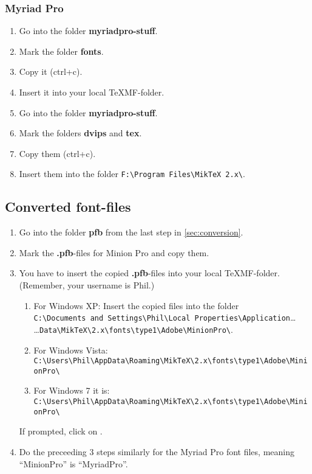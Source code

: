 \subsubsection{Myriad Pro}

\begin{enumerate}\setlength{\itemsep}{-2pt}
	\item Go into the folder \textbf{myriadpro-stuff}.
	\item Mark the folder \textbf{fonts}.
	\item Copy it (ctrl+c).
	\item Insert it into your local {\TeX}MF-folder.
	\item Go into the folder \textbf{myriadpro-stuff}.
	\item Mark the folders \textbf{dvips} and \textbf{tex}.
	\item Copy them (ctrl+c).
	\item Insert them into the folder \verb+F:\Program Files\MikTeX 2.x\+.
\end{enumerate}

\subsection{Converted font-files}

\begin{enumerate}\setlength{\itemsep}{-2pt}
	\item Go into the folder \textbf{pfb} from the last step in \autoref{sec:conversion}.
	\item Mark the \textbf{.pfb}-files for Minion Pro and copy them.
	\item You have to insert the copied \textbf{.pfb}-files into your local {\TeX}MF-folder. (Remember, your username is Phil.)
	\begin{enumerate}
		\item For Windows XP: Insert the copied files into the folder\\
		\verb+C:\Documents and Settings\Phil\Local Properties\Application+\ldots\\
		\ldots\verb+Data\MikTeX\2.x\fonts\type1\Adobe\MinionPro\+.
		\item \normalsize For Windows Vista:\\
		\verb+C:\Users\Phil\AppData\Roaming\MikTeX\2.x\fonts\type1\Adobe\MinionPro\+
		\item For Windows 7 it is:\\
		\verb+C:\Users\Phil\AppData\Roaming\MikTeX\2.x\fonts\type1\Adobe\MinionPro\+
	\end{enumerate}
	\normalsize If prompted, click on .
	\item Do the preceeding 3 steps similarly for the Myriad Pro font files, meaning ``MinionPro'' is ``MyriadPro''.
\end{enumerate}

